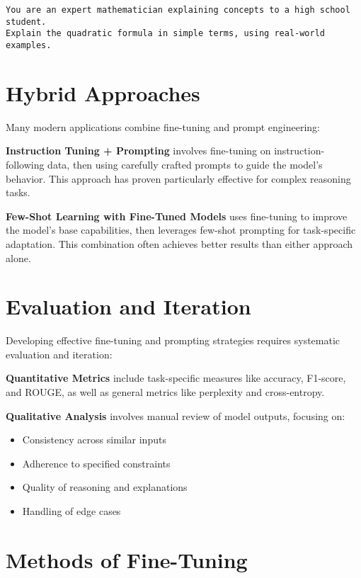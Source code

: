 \begin{verbatim}
You are an expert mathematician explaining concepts to a high school student.
Explain the quadratic formula in simple terms, using real-world examples.
\end{verbatim}

\section{Hybrid Approaches}
\noindent
Many modern applications combine fine-tuning and prompt engineering:

\textbf{Instruction Tuning + Prompting} involves fine-tuning on instruction-following data, then using carefully crafted prompts to guide the model's behavior. This approach has proven particularly effective for complex reasoning tasks.

\textbf{Few-Shot Learning with Fine-Tuned Models} uses fine-tuning to improve the model's base capabilities, then leverages few-shot prompting for task-specific adaptation. This combination often achieves better results than either approach alone.

\section{Evaluation and Iteration}
\noindent
Developing effective fine-tuning and prompting strategies requires systematic evaluation and iteration:

\textbf{Quantitative Metrics} include task-specific measures like accuracy, F1-score, and ROUGE, as well as general metrics like perplexity and cross-entropy.

\textbf{Qualitative Analysis} involves manual review of model outputs, focusing on:
\begin{itemize}
    \item Consistency across similar inputs
    \item Adherence to specified constraints
    \item Quality of reasoning and explanations
    \item Handling of edge cases
\end{itemize}

\section{Methods of Fine-Tuning}
\label{sec:methods_finetune}

